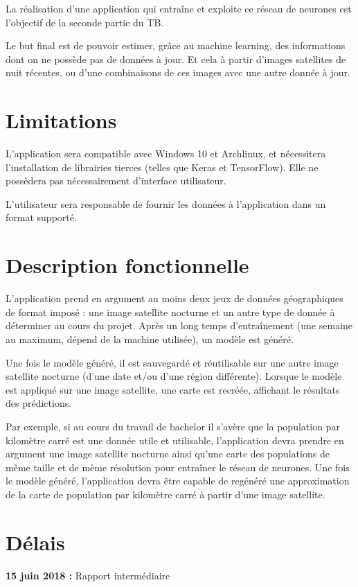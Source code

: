 \documentclass[a4paper, 11pt]{report}
\begin{document}
La réalisation d'une application qui entraîne et exploite ce réseau de neurones est l'objectif de la seconde partie du TB.

Le but final est de pouvoir estimer, grâce au machine learning, des informations dont on ne possède pas de données à jour. Et cela à partir d'images satellites de nuit récentes, ou d'une combinaisons de ces images avec une autre donnée à jour.

\section{Limitations}
L'application sera compatible avec Windows 10 et Archlinux, et nécessitera l'installation de librairies tierces (telles que Keras et TensorFlow).
Elle ne possèdera pas nécessairement d'interface utilisateur.

L'utilisateur sera responsable de fournir les données à l'application dans un format supporté.

\section{Description fonctionnelle}
L'application prend en argument au moins deux jeux de données géographiques de format imposé : une image satellite nocturne et un autre type de donnée à déterminer au cours du projet. Après un long temps d'entraînement (une semaine au maximum, dépend de la machine utilisée), un modèle est généré.

Une fois le modèle généré, il est sauvegardé et réutilisable sur une autre image satellite nocturne (d'une date et/ou d'une région différente). Lorsque le modèle est appliqué sur une image satellite, une carte est recréée, affichant le résultats des prédictions.

Par exemple, si au cours du travail de bachelor il s'avère que la population par kilomètre carré est une donnée utile et utilisable, l'application devra prendre en argument une image satellite nocturne ainsi qu'une carte des populations de même taille et de même résolution pour entraîner le réseau de neurones. Une fois le modèle généré, l'application devra être capable de regénéré une approximation de la carte de population par kilomètre carré à partir d'une image satellite.

\section{Délais}
\textbf{15 juin 2018 :} Rapport intermédiaire
\end{document}
